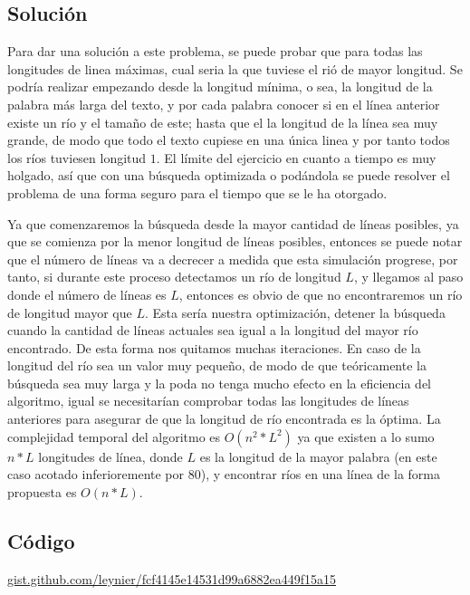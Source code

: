 \documentclass[12pt]{article}
\newcommand{\nl}{\vspace{0.3cm}}
\begin{document}
\subsection{Solución}

Para dar una solución a este problema, se puede probar que para todas las longitudes de linea máximas, cual seria la que tuviese el rió de mayor longitud. Se podría realizar empezando desde la longitud mínima, o sea, la longitud de la palabra más larga del texto, y por cada palabra conocer si en el línea anterior existe un río y el tamaño de este; hasta que el la longitud de la línea sea muy grande, de modo que todo el texto cupiese en una única linea y por tanto todos los ríos tuviesen longitud $1$. El límite del ejercicio en cuanto a tiempo es muy holgado, así que con una búsqueda optimizada o podándola se puede resolver el problema de una forma seguro para el tiempo que se le ha otorgado. 

\nl

Ya que comenzaremos la búsqueda desde la mayor cantidad de líneas posibles, ya que se comienza por la menor longitud de líneas posibles, entonces se puede notar que el número de líneas va a decrecer a medida que esta simulación progrese, por tanto, si durante este proceso detectamos un río de longitud $L$, y llegamos al paso donde el número de líneas es $L$, entonces es obvio de que no encontraremos un río de longitud mayor que $L$. Esta sería nuestra optimización, detener la búsqueda cuando la cantidad de líneas actuales sea igual a la longitud del mayor río encontrado. De esta forma nos quitamos muchas iteraciones. En caso de la longitud del río sea un valor muy pequeño, de modo
de que teóricamente la búsqueda sea muy larga y la poda no tenga mucho efecto en la eficiencia del algoritmo, igual se necesitarían comprobar todas las longitudes de líneas anteriores para asegurar de que la longitud de río encontrada es la óptima. La complejidad temporal del algoritmo es $O(n^2*L^2)$ ya que existen a lo sumo $n*L$ longitudes de línea, donde $L$ es la longitud de la mayor palabra (en este caso acotado inferioremente por 80), y encontrar ríos en una línea de la forma propuesta es $O(n * L)$.

\subsection{Código}

\href{https://gist.github.com/leynier/fcf4145e14531d99a6882ea449f15a15}{gist.github.com/leynier/fcf4145e14531d99a6882ea449f15a15}

\newpage

\nocite{*}


\end{document}
